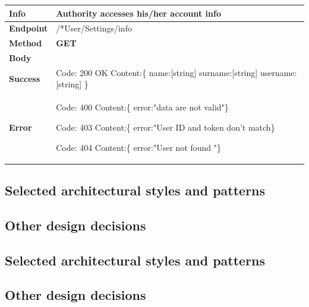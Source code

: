 \begin{table}[H]
\begin{tabular}{|l|p{}|}
\hline
\textbf{Info}             & Authority accesses his/her account info                                                                      \\ \hline
\textbf{Endpoint}    &  /*User/Settings/info\\ \hline
\textbf{Method}         &   \textbf{GET}                                                                            \\ \hline

\textbf{Body}  &
                    \\ \hline
                    
\textbf{Success} &  Code: 200 OK \newline
                    Content:\{\newline 
                    name:[string]\newline
                 surname:[string]\newline
                 username:[string]\newline
                    \}\\ \hline
\textbf{Error} &  Code: 400 \newline
                  Content:\{\newline
                  error:"data are not valid"\newline\}\newline
                  
                  Code: 403 \newline
                  Content:\{\newline
                  error:"User ID and token don't match\newline\}\newline
                  
                  Code: 404 \newline
                  Content:\{\newline
                  error:"User not found "\newline\}\\\hline

\end{tabular}
\end{table}



\subsection{Selected architectural styles and patterns}

\subsection{Other design decisions}

\subsection{Selected architectural styles and patterns}

\subsection{Other design decisions}
